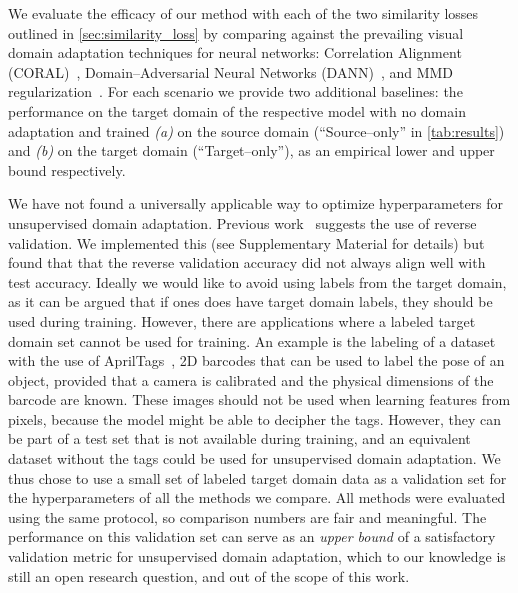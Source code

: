\documentclass{article}
\begin{document}
We evaluate the efficacy of our method with each of the two similarity losses outlined in \autoref{sec:similarity_loss} by comparing against the prevailing visual domain adaptation techniques for neural networks: Correlation Alignment (CORAL)~\cite{sun2015return},  Domain--Adversarial Neural Networks (DANN)~\cite{ganin2014unsupervised,ganin2016domain}, and MMD regularization~\cite{tzeng2015ddc,long2015learning}. 
For each scenario we provide two additional baselines: the performance on the target domain of the respective model with no domain adaptation and trained \textsl{(a)} on the source domain (``Source--only'' in \autoref{tab:results}) and \textsl{(b)} on the target domain (``Target--only''), as an empirical lower and upper bound respectively. 

We have not found a universally applicable way to optimize hyperparameters for unsupervised domain adaptation.  Previous work~\cite{ganin2016domain} suggests the use of reverse validation. We implemented this (see Supplementary Material for details) but found that that the reverse validation accuracy did not always align well with test accuracy. Ideally we would like to avoid using labels from the target domain, as it can be argued that if ones does have target domain labels, they should be used during training. However, there are applications where a labeled target domain set cannot be used for training. An example is the labeling of a dataset with the use of AprilTags~\cite{olson2011apriltag}, 2D barcodes that can be used to label the pose of an object, provided that a camera is calibrated and the physical dimensions of the barcode are known. These images should not be used when learning features from pixels, because the model might be able to decipher the tags. However, they can be part of a test set that is not available during training, and an equivalent dataset without the tags could be used for unsupervised domain adaptation.
 We thus chose to use a small set of labeled target domain data as a validation set for the hyperparameters of all the methods we compare. All methods were evaluated using the same protocol, so comparison numbers are fair and meaningful. The performance on this validation set can serve as an \textsl{upper bound} of a satisfactory validation metric for unsupervised domain adaptation, which to our knowledge is still an open research question, and out of the scope of this work. 
\end{document}
